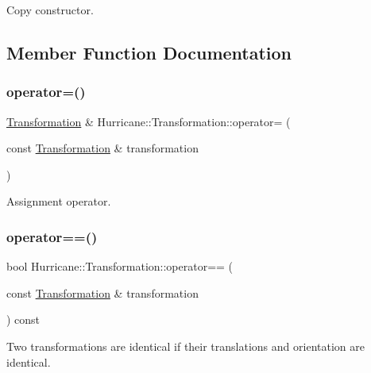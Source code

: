 Copy constructor. 

\subsection{Member Function Documentation}
\mbox{\label{classHurricane_1_1Transformation_aad1158c828cc8ad72eb9f17804495cd2}} 
\subsubsection{\texorpdfstring{operator=()}{operator=()}}
{\footnotesize\ttfamily \hyperlink{classHurricane_1_1Transformation}{Transformation} \& Hurricane\+::\+Transformation\+::operator= (\begin{DoxyParamCaption}\item[{const \hyperlink{classHurricane_1_1Transformation}{Transformation} \&}]{transformation }\end{DoxyParamCaption})}

Assignment operator. \mbox{\label{classHurricane_1_1Transformation_a6dbb6fe21e65506f35e1ee21d09e8447}} 
\subsubsection{\texorpdfstring{operator==()}{operator==()}}
{\footnotesize\ttfamily bool Hurricane\+::\+Transformation\+::operator== (\begin{DoxyParamCaption}\item[{const \hyperlink{classHurricane_1_1Transformation}{Transformation} \&}]{transformation }\end{DoxyParamCaption}) const}

Two transformations are identical if their translations and orientation are identical. \mbox{\label{classHurricane_1_1Transformation_a7cb2ff77e4297fadbbf357d654de66a6}} 
